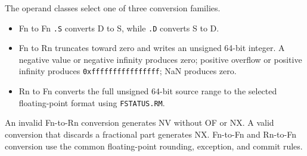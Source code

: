 The operand classes select one of three conversion families.

\begin{itemize}
\item Fn to Fn \texttt{.S} converts D to S, while \texttt{.D} converts S to D.
\item Fn to Rn truncates toward zero and writes an unsigned 64-bit integer. A negative value or negative infinity
produces zero; positive overflow or positive infinity produces \texttt{0xffffffffffffffff}; NaN produces zero.
\item Rn to Fn converts the full unsigned 64-bit source range to the selected floating-point format using
\texttt{FSTATUS.RM}.
\end{itemize}
An invalid Fn-to-Rn conversion generates NV without OF or NX. A valid conversion that discards a fractional part
generates NX. Fn-to-Fn and Rn-to-Fn conversion use the common floating-point rounding, exception, and commit rules.
